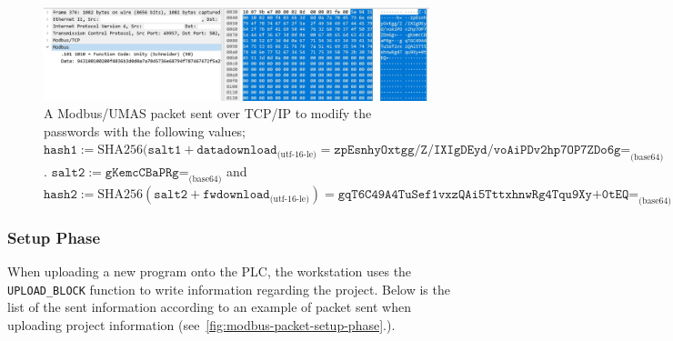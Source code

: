 \begin{figure}[H]
    \centering
    \includegraphics[width=\linewidth]{figures/setup-pwd}
    \caption{A Modbus/UMAS packet sent over TCP/IP to modify the passwords with the following values; $\texttt{hash1} := \textrm{SHA256}(\texttt{salt1} + \texttt{datadownload}_{\textrm{(utf-16-le)}} = \texttt{zpEsnhyOxtgg/Z/IXIgDEyd/voAiPDv2hp7OP7ZDo6g=}_{\textrm{(base64)}}$. $\texttt{salt2} := \texttt{gKemcCBaPRg=}_{\textrm{(base64)}}$ and $\texttt{hash2} := \textrm{SHA256}(\texttt{salt2} + \texttt{fwdownload}_{\textrm{(utf-16-le)}}) = \texttt{gqT6C49A4TuSef1vxzQAi5TttxhnwRg4Tqu9Xy+0tEQ=}_{\textrm{(base64)}}$ }
    \label{fig:modbus-packet-setup-pwd}
\end{figure}


\subsubsection{Setup Phase}

\label{subsec:setup-phase}

When uploading a new program onto the PLC, the workstation uses the \texttt{UPLOAD\_BLOCK} function to write information regarding the project. Below is the list of the sent information according to an example of packet sent when uploading project information (see~\autoref{fig:modbus-packet-setup-phase}.).


